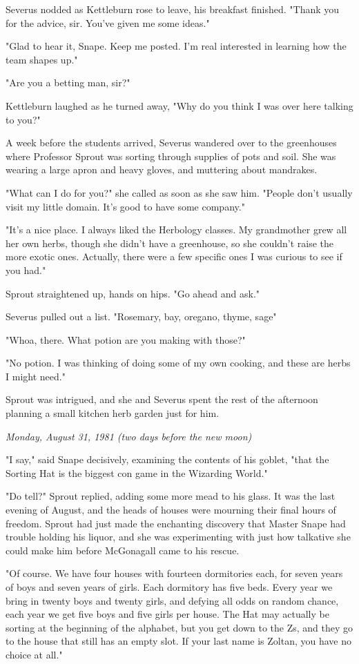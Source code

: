 Severus nodded as Kettleburn rose to leave, his breakfast finished. "Thank you for the advice, sir. You've given me some ideas."

"Glad to hear it, Snape. Keep me posted. I'm real interested in learning how the team shapes up."

"Are you a betting man, sir?"

Kettleburn laughed as he turned away, "Why do you think I was over here talking to you?"

A week before the students arrived, Severus wandered over to the greenhouses where Professor Sprout was sorting through supplies of pots and soil. She was wearing a large apron and heavy gloves, and muttering about mandrakes.

"What can I do for you?" she called as soon as she saw him. "People don't usually visit my little domain. It's good to have some company."

"It's a nice place. I always liked the Herbology classes. My grandmother grew all her own herbs, though she didn't have a greenhouse, so she couldn't raise the more exotic ones. Actually, there were a few specific ones I was curious to see if you had."

Sprout straightened up, hands on hips. "Go ahead and ask."

Severus pulled out a list. "Rosemary, bay, oregano, thyme, sage{\el}"

"Whoa, there. What potion are you making with those?"

"No potion. I was thinking of doing some of my own cooking, and these are herbs I might need."

Sprout was intrigued, and she and Severus spent the rest of the afternoon planning a small kitchen herb garden just for him.

\emph{Monday, August 31, 1981 (two days before the new moon)}

"I say," said Snape decisively, examining the contents of his goblet, "that the Sorting Hat is the biggest con game in the Wizarding World."

"Do tell?" Sprout replied, adding some more mead to his glass. It was the last evening of August, and the heads of houses were mourning their final hours of freedom. Sprout had just made the enchanting discovery that Master Snape had trouble holding his liquor, and she was experimenting with just how talkative she could make him before McGonagall came to his rescue.

"Of course. We have four houses with fourteen dormitories each, for seven years of boys and seven years of girls. Each dormitory has five beds. Every year we bring in twenty boys and twenty girls, and defying all odds on random chance, each year we get five boys and five girls per house. The Hat may actually be sorting at the beginning of the alphabet, but you get down to the Zs, and they go to the house that still has an empty slot. If your last name is Zoltan, you have no choice at all."

